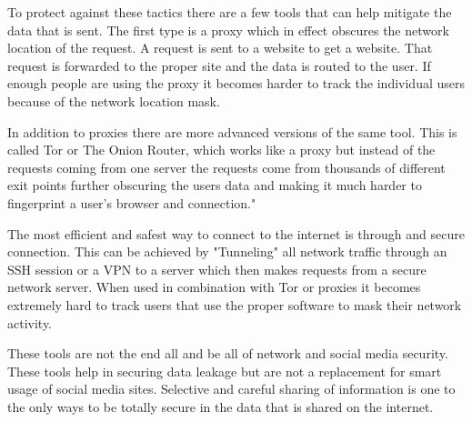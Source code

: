 To protect against these tactics there are a few tools that can help mitigate the
data that is sent. The first type is a proxy which in effect obscures the
network location of the request. A request is sent to a website to get a
website. That request is forwarded to the proper site and the data is routed to
the user. If enough people are using the proxy it becomes harder to track the
individual users because of the network location mask.

In addition to proxies there are more advanced versions of the same tool. This
is called Tor or The Onion Router, which works like a proxy but instead of the
requests coming from one server the requests come from thousands of different
exit points further obscuring the users data and making it much harder to
fingerprint a user's browser and connection."

The most efficient and safest way to connect to the internet is through and
secure connection. This can be achieved by "Tunneling" all network traffic
through an SSH session or a VPN to a server which then makes requests from a secure
network server. When used in combination with Tor or proxies it becomes
extremely hard to track users that use the proper software to mask their network
activity.

These tools are not the end all and be all of network and social media security.
These tools help in securing data leakage but are not a replacement for smart
usage of social media sites. Selective and careful sharing of information is one
to the only ways to be totally secure in the data that is shared on the
internet.
